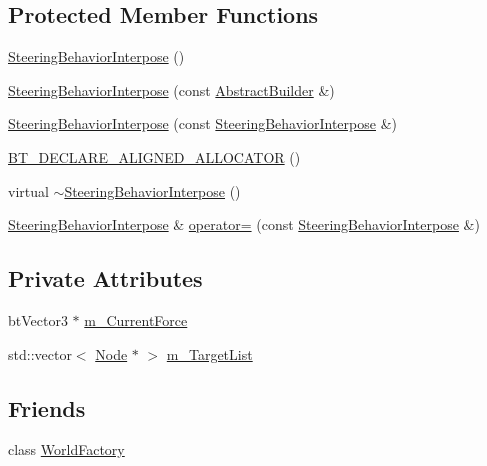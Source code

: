 \subsection*{Protected Member Functions}
\begin{DoxyCompactItemize}
\item 
\mbox{\hyperlink{classnjli_1_1_steering_behavior_interpose_aa5f1edff3ea4552ec514e30855e2983c}{Steering\+Behavior\+Interpose}} ()
\item 
\mbox{\hyperlink{classnjli_1_1_steering_behavior_interpose_a6a427ae3226dc1caf4133c1b0be56553}{Steering\+Behavior\+Interpose}} (const \mbox{\hyperlink{classnjli_1_1_abstract_builder}{Abstract\+Builder}} \&)
\item 
\mbox{\hyperlink{classnjli_1_1_steering_behavior_interpose_aac62d2994af0a88c8485575c30de5d5a}{Steering\+Behavior\+Interpose}} (const \mbox{\hyperlink{classnjli_1_1_steering_behavior_interpose}{Steering\+Behavior\+Interpose}} \&)
\item 
\mbox{\hyperlink{classnjli_1_1_steering_behavior_interpose_a2e148a46d38bc7803dfce9edb8db73f7}{B\+T\+\_\+\+D\+E\+C\+L\+A\+R\+E\+\_\+\+A\+L\+I\+G\+N\+E\+D\+\_\+\+A\+L\+L\+O\+C\+A\+T\+OR}} ()
\item 
virtual \mbox{\hyperlink{classnjli_1_1_steering_behavior_interpose_a3ba28746cb143f59dccebac34ed473de}{$\sim$\+Steering\+Behavior\+Interpose}} ()
\item 
\mbox{\hyperlink{classnjli_1_1_steering_behavior_interpose}{Steering\+Behavior\+Interpose}} \& \mbox{\hyperlink{classnjli_1_1_steering_behavior_interpose_ad0ab9efa14f816cb0f21507445c85069}{operator=}} (const \mbox{\hyperlink{classnjli_1_1_steering_behavior_interpose}{Steering\+Behavior\+Interpose}} \&)
\end{DoxyCompactItemize}
\subsection*{Private Attributes}
\begin{DoxyCompactItemize}
\item 
bt\+Vector3 $\ast$ \mbox{\hyperlink{classnjli_1_1_steering_behavior_interpose_a49bf6ea1ffa7177f33017f9ce2afe350}{m\+\_\+\+Current\+Force}}
\item 
std\+::vector$<$ \mbox{\hyperlink{classnjli_1_1_node}{Node}} $\ast$ $>$ \mbox{\hyperlink{classnjli_1_1_steering_behavior_interpose_ab3b1b3d85102e5a29b6ba57e99acb160}{m\+\_\+\+Target\+List}}
\end{DoxyCompactItemize}
\subsection*{Friends}
\begin{DoxyCompactItemize}
\item 
class \mbox{\hyperlink{classnjli_1_1_steering_behavior_interpose_acb96ebb09abe8f2a37a915a842babfac}{World\+Factory}}
\end{DoxyCompactItemize}
